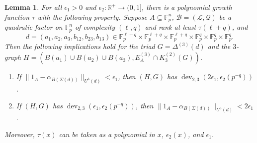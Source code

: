 \documentclass[12pt,oneside,british,a4wide]{amsart}
\newtheorem{lemma}[theorem]{Lemma}
\numberwithin{equation}{section}
\theoremstyle{definition}
\def\F{\mathbb{F}}
\def\e{\epsilon}
\newcommand{\calL}{\mathcal{L}}
\newcommand{\calB}{\mathcal{B}}
\newcommand{\calQ}{\mathcal{Q}}
\def\dev{\operatorname{dev}}
\begin{document}
\begin{lemma}\label{lem:qrtranslate}
For all $\e_1>0$ and $\e_2:\mathbb{R}^+\rightarrow (0,1]$, there is a polynomial growth function $\tau$ with the following property. Suppose $A\subseteq \mathbb{F}_p^n$, $\calB=(\calL,\calQ)$ be a quadratic factor on $\F_p^n$ of complexity $(\ell,q)$ and rank at least $\tau(\ell+q)$, and  
$$
d=(a_1,a_2,a_3,b_{12},b_{23},b_{13})\in \mathbb{F}_p^{\ell+q}\times \F_p^{\ell+q}\times \F_p^{\ell+q}\times \F_p^q\times \F_p^q\times \F_p^q.
$$
Then the following implications hold for the triad  $G=\Delta^{(3)}(d)$  and the $3$-graph $H=(B(a_1)\cup B(a_2)\cup B(a_3), E_A^{(3)}\cap K_3^{(2)}(G))$.
\begin{enumerate}[label=\normalfont(\roman*)]
\item If $\|1_A-\alpha_{B(\Sigma(d))}\|_{U^3(d)}<\e_1 $, then $(H, G)$ has $\dev_{2,3}(2\e_1,\e_2(p^{-q}))$.
\item If $(H, G)$ has $\dev_{2,3}(\e_1,\e_2(p^{-q}))$, then $\|1_A-\alpha_{B(\Sigma(d))}\|_{U^3(d)}< 2 \e_1$.
\end{enumerate}
Moreover, $\tau(x)$ can be taken as a polynomial in $x$, $\e_2(x)$, and $\e_1$.
\end{lemma}
\end{document}
